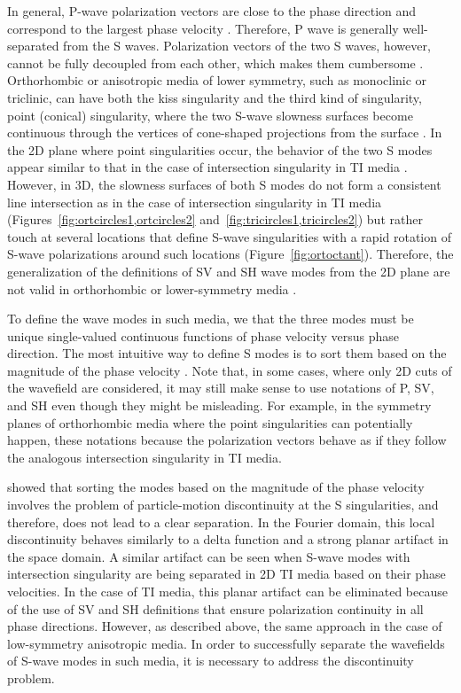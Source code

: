 In general, P-wave polarization vectors are close to the phase direction and correspond to the largest phase velocity \cite[]{cramp1984}.
Therefore, P wave is generally well-separated from the S waves. Polarization vectors of the two S waves, however, cannot be fully decoupled from each other, which makes them cumbersome . Orthorhombic or anisotropic media of lower symmetry, such as monoclinic or triclinic, can have both the kiss singularity and the third kind of singularity, point (conical) singularity, where the two S-wave slowness surfaces become continuous through the vertices of cone-shaped projections from the surface \cite[]{crampyedlin}. In the 2D plane where point singularities occur, the behavior of the two S modes appear similar to that in the case of intersection singularity in TI media \cite[]{vavsing}. However, in 3D, the slowness surfaces of both S modes do not form a consistent line intersection as in the case of intersection singularity in TI media (Figures~\ref{fig:ortcircles1,ortcircles2} and~\ref{fig:tricircles1,tricircles2}) but rather touch at several locations that define S-wave singularities with a rapid rotation of S-wave polarizations around such locations (Figure~\ref{fig:ortoctant}). Therefore, the generalization of the definitions of SV and SH wave modes from the 2D plane are not valid in orthorhombic or lower-symmetry media \cite[]{tsvankinbook}.

To define the wave modes in such media, we  that the three modes must be unique single-valued continuous functions of phase velocity versus phase direction. The most intuitive way to define S modes is to sort them based on the magnitude of the phase velocity \cite[]{joethesis}. Note that, in some cases, where only 2D cuts of the wavefield are considered, it may still make sense to use notations of P, SV, and SH even though they might be misleading. For example, in the symmetry planes of orthorhombic media where the point singularities can potentially happen, these notations  because the polarization vectors behave as if they follow the analogous intersection singularity in TI media.

\cite{joethesis} showed that sorting the modes based on the magnitude of the phase velocity involves the problem of particle-motion discontinuity at the S singularities, and therefore, does not lead to a clear separation. In the Fourier domain, this local discontinuity behaves similarly to a delta function and  a strong planar artifact in the space domain. A similar artifact can be seen when S-wave modes with intersection singularity are being separated in 2D TI media based on their phase velocities. In the case of TI media, this planar artifact can be eliminated because of the use of SV and SH definitions that ensure polarization continuity in all phase directions. However, as described above, the same approach  in the case of low-symmetry anisotropic media. In order to successfully separate the wavefields of S-wave modes in such media, it is necessary to address the discontinuity problem.

